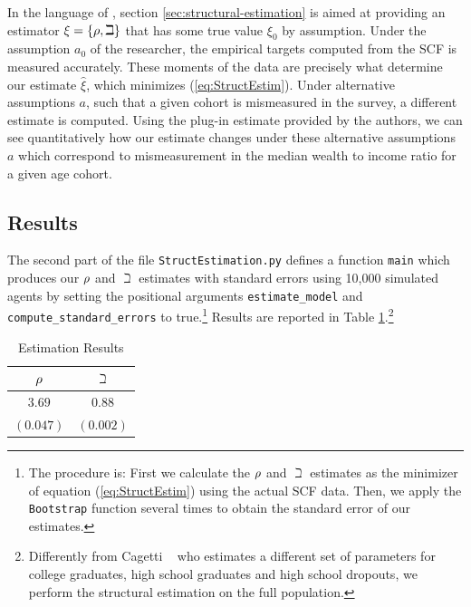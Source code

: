 In the language of \cite{andrews2017measuring}, section \ref{sec:structural-estimation} is aimed at providing an estimator $\xi =\{\rho ,\beth\}$ that has some true value $\xi_0 $ by assumption. Under the assumption $a_0$ of the researcher, the empirical targets computed from the SCF is measured accurately. These moments of the data are precisely what determine our estimate $\hat{\xi}$, which minimizes (\ref{eq:StructEstim}). Under alternative assumptions $a$, such that a given cohort is mismeasured in the survey, a different estimate is computed. Using the plug-in estimate provided by the authors, we can see quantitatively how our estimate changes under these alternative assumptions $a$ which correspond to mismeasurement in the median wealth to income ratio for a given age cohort.

\hypertarget{estimation-results}{}
\subsection{Results}
The second part of the file \texttt{StructEstimation.py}
defines a function \texttt{main} which produces our $\rho$ and
$\beth$ estimates with standard errors using 10,000 simulated
agents by setting the positional arguments \texttt{estimate\_model} and
\texttt{compute\_standard\_errors} to true.\footnote{The procedure is: First we calculate the $\rho$ and
  $\beth$ estimates as the minimizer of equation
  (\ref{eq:StructEstim}) using the actual SCF data. Then, we apply the
  \texttt{Bootstrap} function several times to obtain the standard
  error of our estimates.} Results are reported in Table
\ref{tab:EstResults}.\footnote{Differently from Cagetti
  ~\citeyearpar{cagettiWprofiles} who estimates a different set of
  parameters for college graduates, high school graduates and high
  school dropouts, we perform the structural estimation on
  the full population.}


  \begin{table}[h]
    \caption{Estimation Results}\label{tab:EstResults}
    \center
    \begin{tabular}{cc}
      \hline
      $\rho $ & $\beth$\\
      \hline
      $3.69$ & $0.88$\\
      $(0.047)$ & $(0.002)$\\
      \hline
    \end{tabular}
  \end{table}



